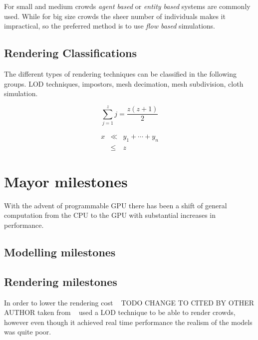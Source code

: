 \documentclass[conference]{acmsiggraph}
\begin{document}
For small and medium crowds \textit{agent based} or \textit{entity based} systems are
commonly used. While for big size crowds the sheer number of individuals
makes it impractical, so the preferred method is to use \textit{flow based}
simulations.

\subsection{Rendering Classifications}

The different types of rendering techniques can be classified in the 
following groups. LOD techniques, impostors, mesh decimation,
mesh subdivision, cloth simulation.

\begin{equation}
 \sum_{j=1}^{z} j = \frac{z(z+1)}{2}
\end{equation}

\begin{eqnarray}
x & \ll & y_{1} + \cdots + y_{n} \\
  & \leq & z
\end{eqnarray}

\section{Mayor milestones}

With the advent of programmable GPU there has been a shift of
general computation from the CPU to the GPU with substantial
increases in performance.

\subsection{Modelling milestones}

\subsection{Rendering milestones}

In order to lower the rendering cost ~\cite{pratt1997humans} TODO CHANGE TO CITED BY OTHER AUTHOR taken from ~\cite{Aubel1999} used a
LOD technique to be able to render crowds, however even though it 
achieved real time performance the realism of the models was quite
poor.
\end{document}
